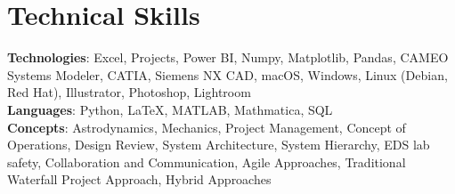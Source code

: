 \section{Technical Skills}
\begin{itemize}[leftmargin=0.15in, label={}]
	\small{\item{
		            \textbf{Technologies}{: Excel, Projects, Power BI, Numpy, Matplotlib, Pandas, CAMEO Systems Modeler, CATIA, Siemens NX CAD, macOS, Windows, Linux (Debian, Red Hat),  Illustrator, Photoshop, Lightroom} \\
		            \textbf{Languages}{: Python, LaTeX, MATLAB, Mathmatica, SQL} \\
		            \textbf{Concepts}{: Astrodynamics, Mechanics, Project Management, Concept of Operations, Design Review, System Architecture, System Hierarchy, EDS lab safety, Collaboration and Communication, Agile Approaches, Traditional Waterfall Project Approach, Hybrid Approaches }
		      }}
\end{itemize}
